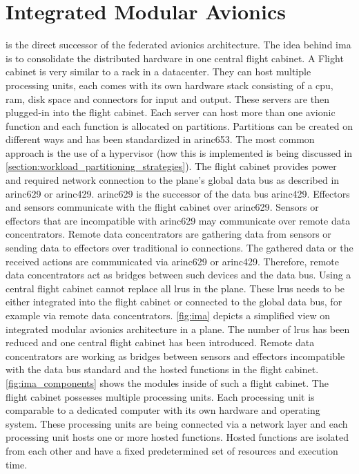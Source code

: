 \documentclass[titlepage]{report}
\begin{document}
\section{Integrated Modular Avionics}\label{section:integrated_modular_avionics}
 is the direct successor of the federated avionics architecture. The idea behind \gls{ima}
is to consolidate the distributed hardware in one central flight cabinet. A Flight cabinet is very similar
to a rack in a datacenter. They can host multiple processing units, each comes with its own hardware stack
consisting of a \gls{cpu}, \gls{ram}, disk space and connectors for input and output\cite{prisaznuk1992integrated}. These servers are then plugged-in 
into the flight cabinet. Each server can host more than one avionic function and each function is allocated on partitions.
Partitions can be created on different ways and has been standardized in \gls{arinc653}\cite{vanderleest2010arinc}. The most common approach
is the use of a hypervisor (how this is implemented is being discussed in \autoref{section:workload_partitioning_strategies}). 
The flight cabinet provides power and required network connection to the plane's global data bus
as described in \gls{arinc629}\cite{isik2010arinc} or \gls{arinc429}\cite{fuchs2012evolution}. \gls{arinc629} is the successor of the data bus \gls{arinc429}.
Effectors and sensors communicate with the flight cabinet over \gls{arinc629}\cite{prisaznuk1992integrated}.
Sensors or effectors that are incompatible with \gls{arinc629} may communicate over remote data concentrators. Remote data concentrators are gathering data from sensors
or sending data to effectors over traditional \gls{io} connections. The gathered data or the received actions are communicated via \gls{arinc629} or \gls{arinc429}. Therefore,
remote data concentrators act as bridges between such devices and the data bus.
Using a central flight cabinet cannot replace all \glspl{lru} in the plane\cite{watkins2007transitioning}. These \glspl{lru} needs to be either integrated into the flight cabinet
or connected to the global data bus, for example via remote data concentrators. \autoref{fig:ima} depicts a simplified view on integrated modular avionics architecture in a plane.
The number of \glspl{lru} has been reduced and one central flight cabinet has been introduced. Remote data concentrators are working as bridges between sensors and effectors incompatible
with the data bus standard and the hosted functions in the flight cabinet. \autoref{fig:ima_components} shows the modules inside of such a flight cabinet. The flight cabinet
possesses multiple processing units. Each processing unit is comparable to a dedicated computer with its own hardware and operating system. These processing units
are being connected via a network layer and each processing unit hosts one or more hosted functions. Hosted functions are isolated from each other and have
a fixed predetermined set of resources and execution time.
\end{document}
